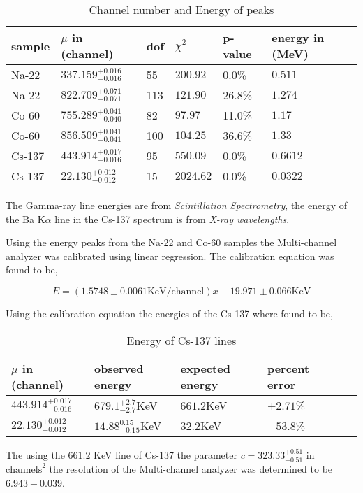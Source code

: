 \documentclass[%
 reprint,
 amsmath,amssymb,
 aps,
]{revtex4-1}
\begin{document}
\begin{table}
\centering
\caption{Channel number and Energy of peaks}
\begin{tabular}{|l|l|l|l|l|l|}
\hline
sample & $\mu$ in (channel) & dof & $\chi^2$ & p-value & energy in (MeV) \\ \hline
Na-22 & $337.159_{-0.016}^{+0.016}$ & 55 & $200.92$ & 0.0\% & $0.511$ \\ \hline
Na-22 & $822.709_{-0.071}^{+0.071}$ & 113 & $121.90$ & 26.8\% & $1.274$ \\ \hline
Co-60 & $755.289_{-0.040}^{+0.041}$ & 82 & $97.97$ & 11.0\% & $1.17$ \\ \hline
Co-60 & $856.509_{-0.041}^{+0.041}$ & 100 & $104.25$ & 36.6\% & $1.33$ \\ \hline
Cs-137 & $443.914_{-0.016}^{+0.017}$ & 95 & $550.09$ & 0.0\% & $0.6612$ \\ \hline
Cs-137 & $22.130_{-0.012}^{+0.012}$ & 15 & $2024.62$ & 0.0\% & $0.0322$ \\ \hline
\end{tabular}
\end{table}

The Gamma-ray line energies are from \textit{Scintillation Spectrometry}\cite{scintillation}, the energy of the Ba $\text{K}\alpha$ line in the Cs-137 spectrum is from \textit{X-ray wavelengths}\cite{xray}.

Using the energy peaks from the Na-22 and Co-60 samples the Multi-channel analyzer was calibrated using linear regression. The calibration equation was found to be,

\[
E = \left(1.5748 \pm 0.0061 \text{KeV}/\text{channel}\right)x - 19.971 \pm 0.066 \text{KeV}
\]

Using the calibration equation the energies of the Cs-137 where found to be,

\begin{table}
\centering
\caption{Energy of Cs-137 lines}
\begin{tabular}{|l|l|l|l|l|l|}
\hline
$\mu$ in (channel) & observed energy & expected energy & percent error \\ \hline
$443.914_{-0.016}^{+0.017}$ & $679.1_{-2.7}^{+2.7}$KeV & $661.2$KeV & $+2.71$\% \\ \hline
$22.130_{-0.012}^{+0.012}$ & $14.88_{-0.15}^{0.15}$KeV & $32.2$KeV & $-53.8$\% \\ \hline
\end{tabular}
\end{table}

The using the $661.2$ KeV line of Cs-137 the parameter $c=323.33_{-0.51}^{+0.51}$ in $\text{channels}^2$ the resolution of the Multi-channel analyzer was determined to be $6.943\pm0.039$.
\end{document}
